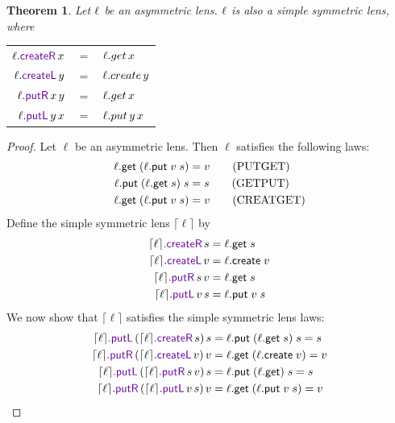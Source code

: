 \documentclass[acmsmall,screen,anonymous]{acmart}
\newtheorem*{theorem*}{Theorem}
\begin{document}
\begin{theorem*}
  Let $\mathit{\ell}$ be an asymmetric lens. $\mathit{\ell}$ is also a simple symmetric lens,
  where
  \begin{center}
    \begin{tabular}{rcl}
      $\Lens.\CreateROf{x}$ & $=$ & $\mathit{\ell}.get \, x$\\
      $\Lens.\CreateLOf{y}$ & $=$ & $\mathit{\ell}.create \, y$\\
      $\Lens.\PutROf{x}{y}$ & $=$ & $\mathit{\ell}.get \, x$\\
      $\Lens.\PutLOf{y}{x}$ & $=$ & $\mathit{\ell}.put \, y \, x$
    \end{tabular}
  \end{center}
\end{theorem*}
\begin{proof}
Let $\ell$ be an asymmetric lens. Then $\ell$ satisfies the following laws:
\begin{align*}
\ell.\mathsf{get} \; (\ell.\mathsf{put} \; v \; s) &= v \tag{PUTGET}\\
\ell.\mathsf{put} \; (\ell.\mathsf{get} \; s) \; s&= s \tag{GETPUT}\\
\ell.\mathsf{get} \; (\ell.\mathsf{put} \; v \; s) &= v \tag{CREATGET}
\end{align*}
Define the simple symmetric lens $\lceil \ell \rceil$ by 
\begin{align*}
\lceil \ell \rceil.\CreateROf{s} &= \ell.\get \; s\\
\lceil \ell \rceil.\CreateLOf{v} &= \ell.\create \; v\\
\lceil \ell \rceil.\PutROf{s}{v} &= \ell.\get \; s\\
\lceil \ell \rceil.\PutLOf{v}{s} &= \ell.\pput \; v \; s\\
\end{align*}
We now show that $\lceil \ell \rceil$ satisfies the simple symmetric lens laws:
\begin{align*}
\lceil \ell \rceil.\PutLOf{(\lceil \ell \rceil.\CreateROf{s})}{s} &= \ell.\pput \; (\ell.\get \; s) \; s = s\\
\lceil \ell \rceil.\PutROf{(\lceil \ell \rceil.\CreateLOf{v})}{v} &= \ell.\get \; (\ell.\create \; v) = v\\
\lceil \ell \rceil.\PutLOf{(\lceil \ell \rceil.\PutROf{s}{v})}{s} &= \ell.\pput \; (\ell.\get) \; s = s\\
\lceil \ell \rceil.\PutROf{(\lceil \ell \rceil.\PutLOf{v}{s})}{v} &= \ell.\get \; (\ell.\pput \; v \; s) = v
\end{align*}
\end{proof}
\end{document}
